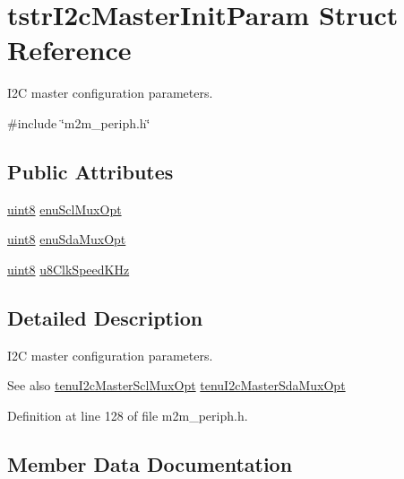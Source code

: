 \hypertarget{structtstrI2cMasterInitParam}{}\section{tstr\+I2c\+Master\+Init\+Param Struct Reference}
\label{structtstrI2cMasterInitParam}


I2C master configuration parameters.  




{\ttfamily \#include \char`\"{}m2m\+\_\+periph.\+h\char`\"{}}

\subsection*{Public Attributes}
\begin{DoxyCompactItemize}
\item 
\hyperlink{group__DataT_ga4df709a77647e870bbf1d955b8edc9a6}{uint8} \hyperlink{structtstrI2cMasterInitParam_a36126c0080f0dd30447276f30f0d8269}{enu\+Scl\+Mux\+Opt}
\item 
\hyperlink{group__DataT_ga4df709a77647e870bbf1d955b8edc9a6}{uint8} \hyperlink{structtstrI2cMasterInitParam_a2ccf575c48101934f675e9ac964a9ee5}{enu\+Sda\+Mux\+Opt}
\item 
\hyperlink{group__DataT_ga4df709a77647e870bbf1d955b8edc9a6}{uint8} \hyperlink{structtstrI2cMasterInitParam_a30a28a8cbc543e37689b5b2b363fee21}{u8\+Clk\+Speed\+K\+Hz}
\end{DoxyCompactItemize}


\subsection{Detailed Description}
I2C master configuration parameters. 

\begin{DoxySeeAlso}{See also}
\hyperlink{m2m__periph_8h_aedf24f1acd49be51c5c86b40240fa257}{tenu\+I2c\+Master\+Scl\+Mux\+Opt} \hyperlink{m2m__periph_8h_ab71cb9b9664cc9318975ee1e4ab8992a}{tenu\+I2c\+Master\+Sda\+Mux\+Opt} 
\end{DoxySeeAlso}


Definition at line 128 of file m2m\+\_\+periph.\+h.



\subsection{Member Data Documentation}
\mbox{\label{structtstrI2cMasterInitParam_a36126c0080f0dd30447276f30f0d8269}} 
